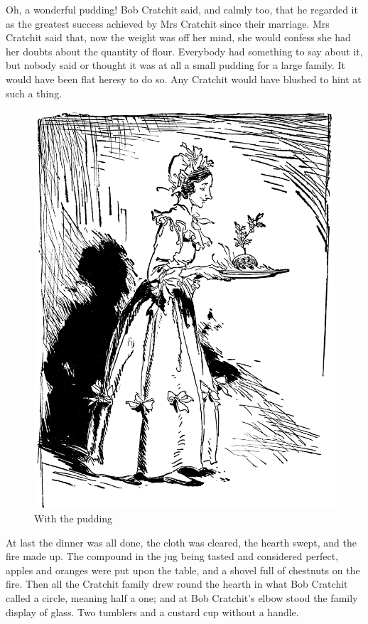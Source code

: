 \documentclass[paper=5.5in:8.5in,BCOR=7mm,twoside,DIV=calc,12pt,usegeometry]{scrbook} %
\begin{document}
Oh, a wonderful pudding! Bob Cratchit said, and calmly too, that he regarded it as the greatest success achieved by Mrs Cratchit since their marriage. Mrs Cratchit said that, now the weight was off her mind, she would confess she had her doubts about the quantity of flour. Everybody had something to say about it, but nobody said or thought it was at all a small pudding for a large family. It would have been flat heresy to do so. Any Cratchit would have blushed to hint at such a thing.

\begin{figure}
\begin{minipage}[c]{\linewidth}
\includegraphics[width=\linewidth]{pud2}
\caption*{With the pudding}
\end{minipage}
\end{figure}

At last the dinner was all done, the cloth was cleared, the hearth swept, and the fire made up. The compound in the jug being tasted and considered perfect, apples and oranges were put upon the table, and a shovel full of chestnuts on the fire. Then all the Cratchit family drew round the hearth in what Bob Cratchit called a circle, meaning half a one; and at Bob Cratchit's elbow stood the family display of glass. Two tumblers and a custard cup without a handle.
\end{document}
